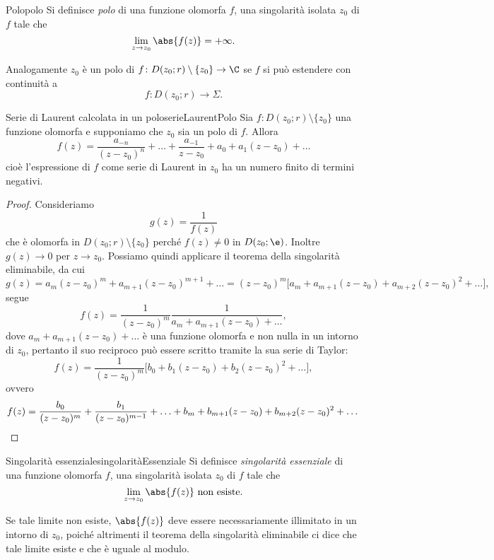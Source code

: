 \begin{defn}{Polo}{polo}
	Si definisce \emph{polo} di una funzione olomorfa \(f\), una singolarità isolata \(z_0\) di \(f\) tale che
	\[
		\lim_{z\to z_0} \abs{f(z)} = +\infty.
	\]
\end{defn}

\begin{oss}
	Analogamente \(z_0\) è un polo di \(f\colon D(z_0;r)\setminus\{z_0\} \to \C\) se \(f\) si può estendere con continuità a
	\[
		f\colon D(z_0;r) \to \Sigma.
	\]
\end{oss}

\begin{prop}{Serie di Laurent calcolata in un polo}{serieLaurentPolo}
	Sia \(f\colon D(z_0;r)\setminus\{z_0\}\) una funzione olomorfa e supponiamo che \(z_0\) sia un polo di \(f\).
	Allora
	\[
		f(z) = \frac{a_{-n}}{(z-z_0)^n} + \ldots + \frac{a_{-1}}{z-z_0} + a_0 + a_1 (z-z_0) + \ldots
	\]
	cioè l'espressione di \(f\) come serie di Laurent in \(z_0\) ha un numero finito di termini negativi.
\end{prop}

\begin{proof}
	Consideriamo
	\[
		g(z) = \frac{1}{f(z)}
	\]
	che è olomorfa in \(D(z_0;r)\setminus\{z_0\}\) perché \(f(z)\neq 0\) in \(D(z_0;\e)\).
	Inoltre \(g(z) \to 0\) per \(z\to z_0\). Possiamo quindi applicare il teorema della singolarità eliminabile, da cui
	\[
		g(z) = a_m (z-z_0)^m + a_{m+1}(z-z_0)^{m+1}+\ldots = (z-z_0)^m \big[a_m+a_{m+1}(z-z_0)+a_{m+2}(z-z_0)^2+\ldots\big],
	\]
	segue
	\[
		f(z) = \frac{1}{(z-z_0)^m} \frac{1}{a_m + a_{m+1}(z-z_0)+\ldots},
	\]
	dove \(a_m + a_{m+1}(z-z_0)+\ldots\) è una funzione olomorfa e non nulla in un intorno di \(z_0\), pertanto il suo reciproco può essere scritto tramite la sua serie di Taylor:
	\[
		f(z) = \frac{1}{(z-z_0)^m} \big[b_0+b_1(z-z_0)+b_2(z-z_0)^2+ \ldots\big],
	\]
	ovvero
	\[
		f(z) = \frac{b_0}{(z-z_0)^m}+ \frac{b_1}{(z-z_0)^{m-1}} + \ldots + b_m + b_{m+1}(z-z_0) + b_{m+2}(z-z_0)^2 + \ldots \qedhere
	\]
\end{proof}

\begin{defn}{Singolarità essenziale}{singolaritàEssenziale}
	Si definisce \emph{singolarità essenziale} di una funzione olomorfa \(f\), una singolarità isolata \(z_0\) di \(f\) tale che
	\[
		\lim_{z\to z_0} \abs{f(z)} \text{ non esiste}.
	\]
\end{defn}

\begin{oss}
	Se tale limite non esiste, \(\abs{f(z)}\) deve essere necessariamente illimitato in un intorno di \(z_0\), poiché altrimenti il teorema della singolarità eliminabile ci dice che tale limite esiste e che è uguale al modulo.
\end{oss}

